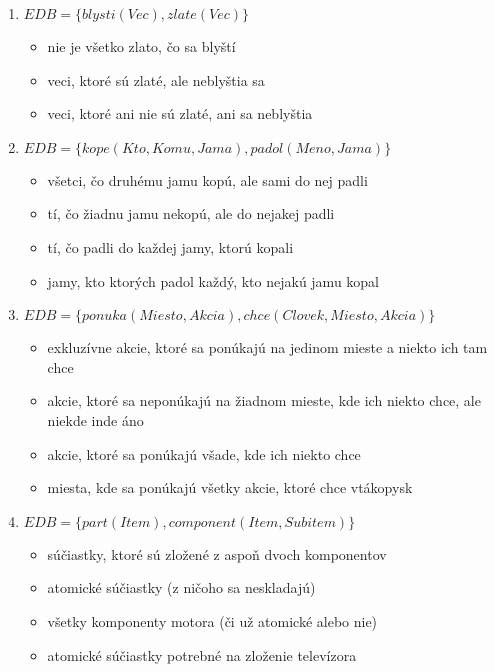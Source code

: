 \documentclass[10pt, a4paper]{article}
\theoremstyle{definition}
\begin{document}
\begin{enumerate}
\item
$EDB = \{blysti(Vec), zlate(Vec)\}$
\begin{itemize}
    \item nie je všetko zlato, čo sa blyští    
    \item veci, ktoré sú zlaté, ale neblyštia sa
    \item veci, ktoré ani nie sú zlaté, ani sa neblyštia
\end{itemize}

\item
$EDB = \{kope(Kto, Komu, Jama), padol(Meno, Jama)\}$
\begin{itemize}
    \item všetci, čo druhému jamu kopú, ale sami do nej padli
    \item tí, čo žiadnu jamu nekopú, ale do nejakej padli
    \item tí, čo padli do každej jamy, ktorú kopali
    \item jamy, kto ktorých padol každý, kto nejakú jamu kopal
\end{itemize}

\item
$EDB = \{ponuka(Miesto, Akcia), chce(Clovek, Miesto, Akcia)\}$
\begin{itemize}
    \item exkluzívne akcie, ktoré sa ponúkajú na jedinom mieste a niekto ich tam chce
    \item akcie, ktoré sa neponúkajú na žiadnom mieste, kde ich niekto chce, ale niekde inde áno
    \item akcie, ktoré sa ponúkajú všade, kde ich niekto chce
    \item miesta, kde sa ponúkajú všetky akcie, ktoré chce vtákopysk
\end{itemize}

\item $EDB = \{part(Item), component(Item, Subitem)\}$
\begin{itemize}
    \item súčiastky, ktoré sú zložené z aspoň dvoch komponentov
    \item atomické súčiastky (z ničoho sa neskladajú)
    \item všetky komponenty motora (či už atomické alebo nie)
    \item atomické súčiastky potrebné na zloženie televízora
\end{itemize}


\end{enumerate}
\end{document}
